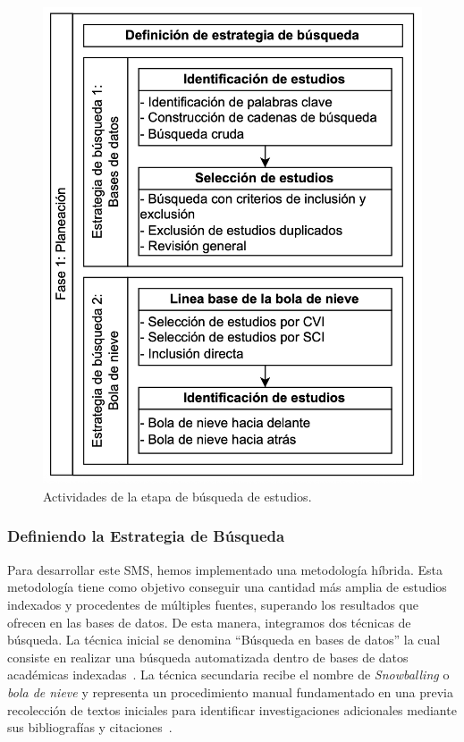 \begin{figure}[htbp]
	\centering
	\vspace{10pt}
	\includegraphics[scale=0.3]{resources/figures/fig03-fase1-planeacion.png}
	\vspace{6pt}
	\caption{Actividades de la etapa de búsqueda de estudios.}
	\label{fig:busqueda-estudios}
\end{figure}

\subsubsection{Definiendo la Estrategia de Búsqueda}\label{subsubsec:estrategia-busqueda}

Para desarrollar este SMS, hemos implementado una metodología híbrida. Esta metodología tiene como objetivo conseguir una cantidad más
amplia de estudios indexados y procedentes de múltiples fuentes, superando los resultados que ofrecen en las bases de datos. De esta manera, integramos dos técnicas de búsqueda. La técnica inicial se denomina ``Búsqueda en bases de datos'' la cual consiste en realizar una búsqueda automatizada dentro de bases de datos académicas indexadas~\cite{Jalai-01}. La técnica secundaria recibe el
nombre de \textit{Snowballing} o  \textit{bola de nieve} y representa un procedimiento manual fundamentado en una  previa recolección de textos iniciales para
identificar investigaciones adicionales mediante sus bibliografías y citaciones~\cite{Jalai-01,Goodman-01}.

